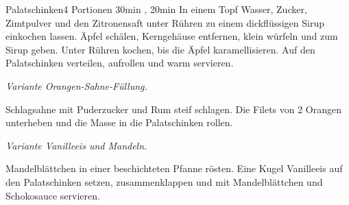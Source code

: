 \documentclass[../recipe-collections/cooking.tex]{subfiles}
\begin{document}
\begin{recipe}{Palatschinken}{4 Portionen }{30min , 20min }
  In einem Topf Wasser, Zucker, Zimtpulver und den Zitronensaft unter Rühren zu einem dickflüssigen Sirup einkochen lassen.
  Äpfel schälen, Kerngehäuse entfernen, klein würfeln und zum Sirup geben.
  Unter Rühren kochen, bis die Äpfel karamellisieren.
  Auf den Palatschinken verteilen, aufrollen und warm servieren.

  \freeform{}\hrulefill{}

  \freeform{}\textit{Variante Orangen-Sahne-Füllung.}


  Schlagsahne mit Puderzucker und Rum steif schlagen.
  Die Filets von 2 Orangen unterheben und die Masse in die Palatschinken rollen.

  \freeform{}\hrulefill{}

  \freeform{}\textit{Variante Vanilleeis und Mandeln.}


  Mandelblättchen in einer beschichteten Pfanne rösten.
  Eine Kugel Vanilleeis auf den Palatschinken setzen, zusammenklappen und mit Mandelblättchen und Schokosauce servieren.

  \freeform{}\hrulefill{}

\end{recipe}
\end{document}
